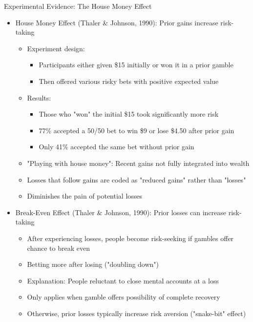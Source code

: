 \documentclass[10pt,handout]{beamer}
\begin{document}
\begin{frame}{Experimental Evidence: The House Money Effect}
  \begin{itemize}[<+->]
    \item House Money Effect (Thaler \& Johnson, 1990): Prior gains increase risk-taking
      \begin{itemize}
        \item Experiment design:
          \begin{itemize}
            \item Participants either given \$15 initially or won it in a prior gamble
            \item Then offered various risky bets with positive expected value
          \end{itemize}
        \item Results:
          \begin{itemize}
            \item Those who "won" the initial \$15 took significantly more risk
            \item 77\% accepted a 50/50 bet to win \$9 or lose \$4.50 after prior gain
            \item Only 41\% accepted the same bet without prior gain
          \end{itemize}
        \item "Playing with house money": Recent gains not fully integrated into wealth
        \item Losses that follow gains are coded as "reduced gains" rather than "losses"
        \item Diminishes the pain of potential losses
      \end{itemize}
    \item Break-Even Effect (Thaler \& Johnson, 1990): Prior losses can increase risk-taking
      \begin{itemize}
        \item After experiencing losses, people become risk-seeking if gambles offer chance to break even
        \item Betting more after losing ("doubling down")
        \item Explanation: People reluctant to close mental accounts at a loss
        \item Only applies when gamble offers possibility of complete recovery
        \item Otherwise, prior losses typically increase risk aversion ("snake-bit" effect)
      \end{itemize}
  \end{itemize}
\end{frame}
\end{document}
